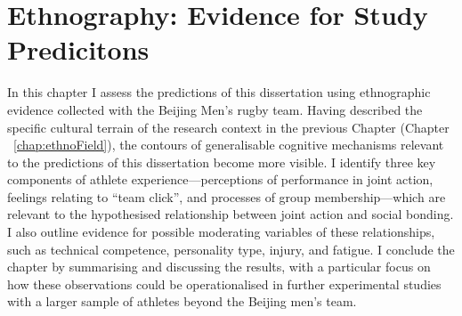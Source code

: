 \chapter{\label{chap:ethnoResults}Ethnography: Evidence for Study Predicitons}

\minitoc



In this chapter I assess the predictions of this dissertation using ethnographic evidence collected with the Beijing Men's rugby team.  Having described the specific cultural terrain of the research context in the previous Chapter (Chapter ~\ref{chap:ethnoField}), the contours of generalisable cognitive mechanisms relevant to the predictions of this dissertation become more visible. I identify three key components of athlete experience---perceptions of performance in joint action, feelings relating to ``team click'', and processes of group membership---which are relevant to the hypothesised relationship between joint action and social bonding.  I also outline evidence for possible moderating variables of these relationships, such as technical competence, personality type, injury, and fatigue.  I conclude the chapter by summarising and discussing the results, with a particular focus on how these observations could be operationalised in further experimental studies with a larger sample of athletes beyond the Beijing men's team.



